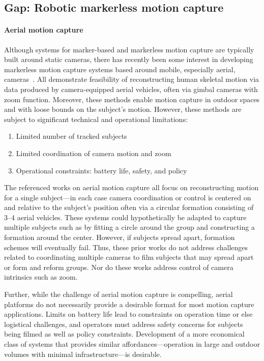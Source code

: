 \documentclass[11pt]{article}
\begin{document}
\subsection{Gap: Robotic markerless motion capture}

\paragraph{Aerial motion capture}
Although systems for marker-based and markerless motion capture are typically
built around static cameras, there has recently been some interest in developing
markerless motion capture systems based around mobile, especially aerial,
cameras~\citep{ho2021iros,saini2022ral,saini2019iccv,hong2024eccv,zhou2018icra}.
All demonstrate feasibility of reconstructing human skeletal motion via data
produced by camera-equipped aerial vehicles, often via gimbal cameras with zoom
function.
Moreover, these methods enable motion capture in outdoor spaces and with loose
bounds on the subject's motion.
However, these methods are subject to significant technical and operational
limitations:
\begin{enumerate}
  \item Limited number of tracked subjects
  \item Limited coordination of camera motion and zoom
  \item Operational constraints: battery life, safety, and policy
\end{enumerate}

The referenced works on aerial motion capture all focus on reconstructing motion
for a single subject---in each case camera coordination or control is centered
on and relative to the subject's position often via a circular formation
consisting of 3--4 aerial vehicles.
These systems could hypothetically be adapted to capture multiple subjects such
as by fitting a circle around the group and constructing a formation around the
center.
However, if subjects spread apart, formation schemes will eventually fail.
Thus, these prior works do not address challenges related to
coordinating multiple cameras to film subjects that may spread apart or form and
reform groups.
Nor do these works address control of camera intrinsics such as zoom.

Further, while the challenge of aerial motion capture is compelling,
aerial platforms do not necessarily provide a desirable format for most motion
capture applications.
Limits on battery life lead to constraints on operation time or else
logistical challenges, and
operators must address safety concerns for subjects being filmed as well as
policy constraints.
Development of a more economical class of systems that provides similar
affordances---operation in large and outdoor volumes with minimal
infrastructure---is desirable.
\end{document}
